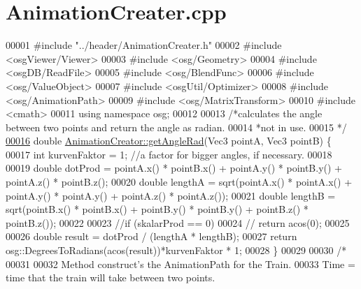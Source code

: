 \hypertarget{_animation_creater_8cpp_source}{\section{Animation\+Creater.\+cpp}
\label{_animation_creater_8cpp_source}
}

\begin{DoxyCode}
00001 \textcolor{preprocessor}{#include "../header/AnimationCreater.h"}
00002 \textcolor{preprocessor}{#include <osgViewer/Viewer>}
00003 \textcolor{preprocessor}{#include <osg/Geometry>}
00004 \textcolor{preprocessor}{#include <osgDB/ReadFile>}
00005 \textcolor{preprocessor}{#include <osg/BlendFunc>}
00006 \textcolor{preprocessor}{#include <osg/ValueObject>}
00007 \textcolor{preprocessor}{#include <osgUtil/Optimizer>}
00008 \textcolor{preprocessor}{#include <osg/AnimationPath>}
00009 \textcolor{preprocessor}{#include <osg/MatrixTransform>}
00010 \textcolor{preprocessor}{#include <cmath>}
00011 \textcolor{keyword}{using namespace }osg;
00012 
00013 \textcolor{comment}{/*calculates the angle between two points and return the angle as radian.}
00014 \textcolor{comment}{ *not in use.}
00015 \textcolor{comment}{ */}
\hypertarget{_animation_creater_8cpp_source_l00016}{}\hyperlink{class_animation_creator_a03e8400c38e8710ee20fd44f57ab1903}{00016} \textcolor{keywordtype}{double} \hyperlink{class_animation_creator_a03e8400c38e8710ee20fd44f57ab1903}{AnimationCreator::getAngleRad}(Vec3 pointA, Vec3 pointB) \{
00017     \textcolor{keywordtype}{int} kurvenFaktor = 1; \textcolor{comment}{//a factor for bigger angles, if necessary.}
00018     
00019     \textcolor{keywordtype}{double} dotProd = pointA.x() * pointB.x() + pointA.y() * pointB.y() + pointA.z() * pointB.z();
00020     \textcolor{keywordtype}{double} lengthA = sqrt(pointA.x() * pointA.x() + pointA.y() * pointA.y() + pointA.z() * pointA.z());
00021     \textcolor{keywordtype}{double} lengthB = sqrt(pointB.x() * pointB.x() + pointB.y() * pointB.y() + pointB.z() * pointB.z());
00022 
00023     \textcolor{comment}{//if (skalarProd == 0)}
00024      \textcolor{comment}{//   return acos(0);}
00025 
00026     \textcolor{keywordtype}{double} result = dotProd / (lengthA * lengthB);
00027     \textcolor{keywordflow}{return} osg::DegreesToRadians(acos(result))*kurvenFaktor *  1;
00028 \}
00029 
00030 \textcolor{comment}{/*}
00031 \textcolor{comment}{}
00032 \textcolor{comment}{Method construct's the AnimationPath for the Train.}
00033 \textcolor{comment}{Time = time that the train will take between two points.}

\end{DoxyCode}
